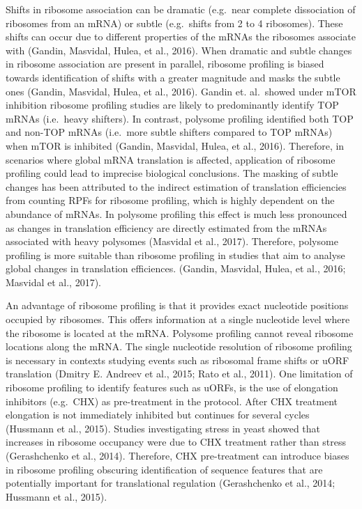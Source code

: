 \documentclass[
  12pt,
  openany]{book}
\begin{document}
Shifts in ribosome association can be dramatic (e.g.~near complete dissociation of ribosomes from an mRNA) or subtle (e.g.~shifts from 2 to 4 ribosomes). These shifts can occur due to different properties of the mRNAs the ribosomes associate with (Gandin, Masvidal, Hulea, et al., 2016). When dramatic and subtle changes in ribosome association are present in parallel, ribosome profiling is biased towards identification of shifts with a greater magnitude and masks the subtle ones (Gandin, Masvidal, Hulea, et al., 2016). Gandin et. al.~showed under mTOR inhibition ribosome profiling studies are likely to predominantly identify TOP mRNAs (i.e.~heavy shifters). In contrast, polysome profiling identified both TOP and non-TOP mRNAs (i.e.~more subtle shifters compared to TOP mRNAs) when mTOR is inhibited (Gandin, Masvidal, Hulea, et al., 2016). Therefore, in scenarios where global mRNA translation is affected, application of ribosome profiling could lead to imprecise biological conclusions. The masking of subtle changes has been attributed to the indirect estimation of translation efficiencies from counting RPFs for ribosome profiling, which is highly dependent on the abundance of mRNAs. In polysome profiling this effect is much less pronounced as changes in translation efficiency are directly estimated from the mRNAs associated with heavy polysomes (Masvidal et al., 2017). Therefore, polysome profiling is more suitable than ribosome profiling in studies that aim to analyse global changes in translation efficiences. (Gandin, Masvidal, Hulea, et al., 2016; Masvidal et al., 2017).

An advantage of ribosome profiling is that it provides exact nucleotide positions occupied by ribosomes. This offers information at a single nucleotide level where the ribosome is located at the mRNA. Polysome profiling cannot reveal ribosome locations along the mRNA. The single nucleotide resolution of ribosome profiling is necessary in contexts studying events such as ribosomal frame shifts or uORF translation (Dmitry E. Andreev et al., 2015; Rato et al., 2011). One limitation of ribosome profiling to identify features such as uORFs, is the use of elongation inhibitors (e.g.~CHX) as pre-treatment in the protocol. After CHX treatment elongation is not immediately inhibited but continues for several cycles (Hussmann et al., 2015). Studies investigating stress in yeast showed that increases in ribosome occupancy were due to CHX treatment rather than stress (Gerashchenko et al., 2014). Therefore, CHX pre-treatment can introduce biases in ribosome profiling obscuring identification of sequence features that are potentially important for translational regulation (Gerashchenko et al., 2014; Hussmann et al., 2015).
\end{document}
